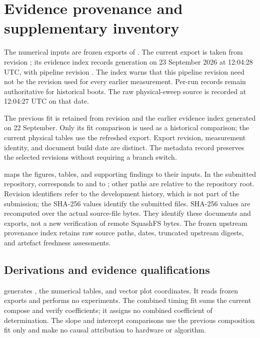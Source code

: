 \chapter{Evidence provenance and supplementary inventory}
\label{app:provenance}

The numerical inputs are frozen exports of . The current export is taken from revision \texttt{}; its evidence index records generation on 23 September 2026 at 12:04:28 UTC, with pipeline revision \texttt{}. The index warns that this pipeline revision need not be the revision used for every earlier measurement. Per-run records remain authoritative for historical boots. The raw physical-sweep source is recorded at 12:04:27 UTC on that date.

The previous fit is retained from revision \texttt{} and the earlier evidence index generated on 22 September. Only its fit comparison is used as a historical comparison; the current physical tables use the refreshed export. Export revision, measurement identity, and document build date are distinct. The metadata record  preserves the selected revisions without requiring a branch switch.

 maps the figures, tables, and supporting findings to their inputs. In the submitted repository,  corresponds to  and  to ; other paths are relative to the repository root. Revision identifiers refer to the development history, which is not part of the submission; the SHA-256 values identify the submitted files. SHA-256 values are recomputed over the actual source-file bytes. They identify these documents and exports, not a new verification of remote SquashFS bytes. The frozen upstream provenance index retains raw source paths, dates, truncated upstream digests, and artefact freshness assessments.



\section{Derivations and evidence qualifications}

 generates , the numerical tables, and vector plot coordinates. It reads frozen exports and performs no experiments. The combined timing fit sums the current compose and verify coefficients; it assigns no combined coefficient of determination. The slope and intercept comparisons use the previous composition fit only and make no causal attribution to hardware or algorithm.

